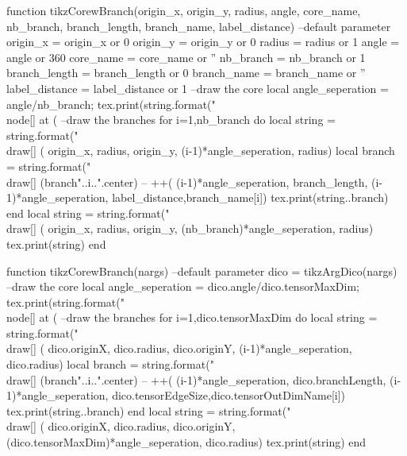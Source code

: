 \begin{luacode*}
	function tikzCorewBranch(origin_x, origin_y, radius, angle, core_name, nb_branch, branch_length, branch_name, label_distance)
		--default parameter
		origin_x = origin_x or 0
		origin_y = origin_y or 0
		radius = radius or 1
		angle = angle or 360
		core_name = core_name or ''
		nb_branch = nb_branch or 1
		branch_length = branch_length or 0
		branch_name = branch_name or ''
		label_distance = label_distance or 1
		--draw the core
		local angle_seperation = angle/nb_branch;
		tex.print(string.format("\\node[] at (%
		--draw the branches
		for i=1,nb_branch do
			local string = string.format("\\draw[] (%
			origin_x, radius, origin_y, (i-1)*angle_seperation, radius)
			local branch = string.format("\\draw[] (branch"..i..".center) -- ++(%
			(i-1)*angle_seperation, branch_length, (i-1)*angle_seperation, label_distance,branch_name[i])
			tex.print(string..branch)
		end
		local string = string.format("\\draw[] (%
		origin_x, radius, origin_y, (nb_branch)*angle_seperation, radius)
		tex.print(string)
	end

	function tikzCorewBranch(nargs)
		--default parameter
		dico = tikzArgDico(nargs)
		--draw the core
		local angle_seperation = dico.angle/dico.tensorMaxDim;
		tex.print(string.format("\\node[] at (%
		--draw the branches
		for i=1,dico.tensorMaxDim do
			local string = string.format("\\draw[] (%
			dico.originX, dico.radius, dico.originY, (i-1)*angle_seperation, dico.radius)
			local branch = string.format("\\draw[] (branch"..i..".center) -- ++(%
			(i-1)*angle_seperation, dico.branchLength, (i-1)*angle_seperation, dico.tensorEdgeSize,dico.tensorOutDimName[i])
			tex.print(string..branch)
		end
		local string = string.format("\\draw[] (%
		dico.originX, dico.radius, dico.originY, (dico.tensorMaxDim)*angle_seperation, dico.radius)
		tex.print(string)
	end
  

\end{luacode*}
